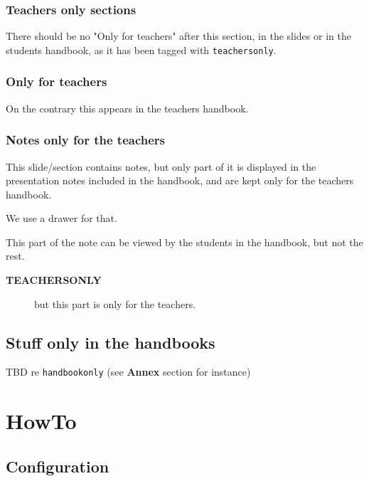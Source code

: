 \documentclass[a4paper]{article}
\newenvironment{NOTES}{\begin{lrbox}{\mybox}\begin{minipage}{0.9\textwidth}\begin{shaded}}{\end{shaded}\end{minipage}\end{lrbox}\fbox{\usebox{\mybox}}}
\begin{document}
\subsubsection{Teachers only sections}
\label{sec:orgad30e1e}

There should be no "Only for teachers" after this section, in the slides or in the
students handbook, as it has been tagged with \texttt{teachersonly}.

\subsubsection{Only for teachers}
\label{sec:org9f60d30}

On the contrary this appears in the teachers handbook.

\subsubsection{Notes only for the teachers}
\label{sec:orgec1d224}

This slide/section contains notes, but only part of it is displayed in
the presentation notes included in the handbook, and are kept only for
the teachers handbook.

We use a drawer for that.

\begin{NOTES}


This part of the note can be viewed by the students in the handbook,
but not the rest.

\begin{description}
\item[{\textbf{TEACHERSONLY}}] but this part is only for the teachers.
\end{description}
\end{NOTES}

\subsection{Stuff only in the handbooks}
\label{sec:org56902e3}

TBD re \texttt{handbookonly} (see \textbf{Annex} section for instance)

\section{HowTo}
\label{sec:orgaf41d47}
\subsection{Configuration}
\label{sec:org3c23696}
\end{document}
